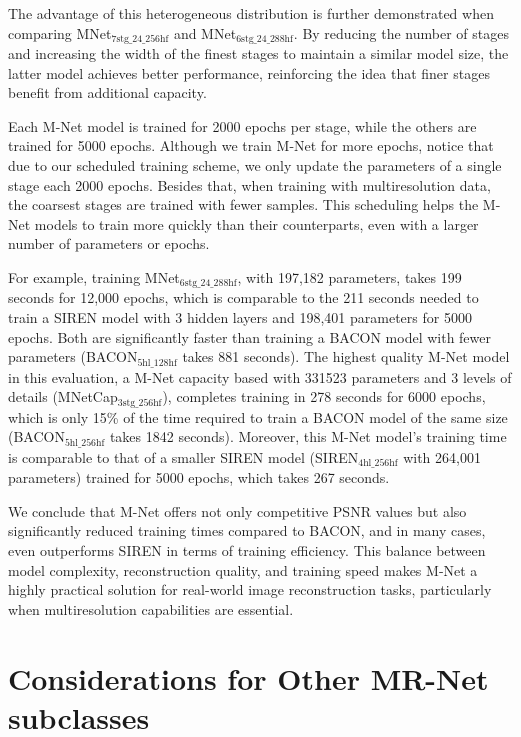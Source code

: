 The advantage of this heterogeneous distribution is further demonstrated when comparing MNet$_\text{7stg\_24\_256hf}$ and MNet$_\text{6stg\_24\_288hf}$. By reducing the number of stages and increasing the width of the finest stages to maintain a similar model size, the latter model achieves better performance, reinforcing the idea that finer stages benefit from additional capacity.


Each M-Net model is trained for 2000 epochs per stage, while the others are trained for 5000 epochs. Although we train M-Net for more epochs, notice that due to our scheduled training scheme, we only update the parameters of a single stage each 2000 epochs. Besides that, when training with multiresolution data, the coarsest stages are trained with fewer samples. This scheduling helps the M-Net models to train more quickly than their counterparts, even with a larger number of parameters or epochs. 

For example, training MNet$_\text{6stg\_24\_288hf}$, with 197,182 parameters, takes 199 seconds for 12,000 epochs, which is comparable to the 211 seconds needed to train a SIREN model with 3 hidden layers and 198,401 parameters for 5000 epochs. Both are significantly faster than training a BACON model with fewer parameters (BACON$_\text{5hl\_128hf}$ takes 881 seconds). The highest quality M-Net model in this evaluation, a M-Net capacity based with 331523 parameters and 3 levels of details (MNetCap$_\text{3stg\_256hf}$), completes training in 278 seconds for 6000 epochs, which is only 15\% of the time required to train a BACON model of the same size (BACON$_\text{5hl\_256hf}$ takes 1842 seconds). Moreover, this M-Net model’s training time is comparable to that of a smaller SIREN model (SIREN$_\text{4hl\_256hf}$ with 264,001 parameters) trained for 5000 epochs, which takes 267 seconds.

We conclude that M-Net offers not only competitive PSNR values but also significantly reduced training times compared to BACON, and in many cases, even outperforms SIREN in terms of training efficiency. This balance between model complexity, reconstruction quality, and training speed makes M-Net a highly practical solution for real-world image reconstruction tasks, particularly when multiresolution capabilities are essential.

\section{Considerations for Other MR-Net subclasses}\label{sec:considerations}


